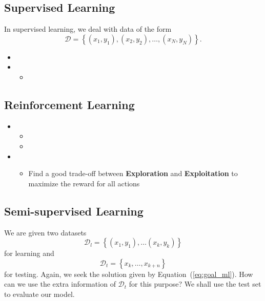 \subsection{Supervised Learning}
In supervised learning, we deal with data of the form %
\begin{equation}
\mathcal{D} = \left\{ (x_1,y_1),(x_2,y_2), \ldots, (x_N,y_N) \right\}.
\label{eq:supervised_train_set}
\end{equation}
\begin{itemize}
	\item{}
	\item{}%
	\begin{itemize}
		\item{}
	\end{itemize}
\end{itemize}
%
%
%
\subsection{Reinforcement Learning}
\begin{itemize}
	\item{}
	\begin{itemize}
		\item{}%
		\item{}%
	\end{itemize}
	\item{}%
	\begin{itemize}
		\item Find a good trade-off between \textbf{Exploration} and \textbf{Exploitation} to maximize the reward for all actions
	\end{itemize}
\end{itemize}
%
%
%
\subsection{Semi-supervised Learning}\label{ssec:SSL}
We are given two datasets %
\begin{equation}
\mathcal{D}_l = \left\{(x_1,y_1),\ldots(x_k,y_k)\right\}
\label{eq:SSL_train_set}
\end{equation}
for learning and %
\begin{equation}
\mathcal{D}_t = \left\{x_k,\ldots,x_{k+n}\right\}
\label{eq:SSL_test_set}
\end{equation}
for testing. %
Again, we seek the solution given by Equation~(\ref{eq:goal_ml}). %
How can we use the extra information of $\mathcal{D}_t$ for this purpose? %
We shall use the test set to evaluate our model. %
%
%
%
